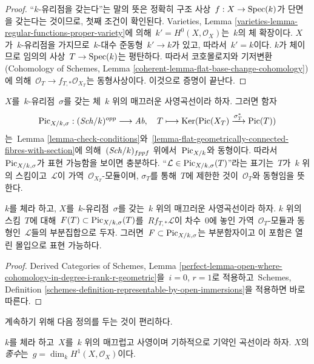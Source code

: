 \begin{proof}
“$k$-유리점을 갖는다”는 말의 뜻은 정확히 구조 사상\ 
$f : X \to \mathop{\mathrm{Spec}}(k)$가 단면을 갖는다는 것이므로, 첫째 조건이 확인된다.
Varieties, Lemma \ref{varieties-lemma-regular-functions-proper-variety}에 의해\ 
$k' = H^0(X, \mathcal{O}_X)$는\  $k$의 체 확장이다. $X$가\  $k$-유리점을
가지므로\  $k$-대수 준동형\  $k' \to k$가 있고, 따라서\  $k' = k$이다.
$k$가 체이므로 임의의 사상\  $T \to \mathop{\mathrm{Spec}}(k)$는 평탄하다. 따라서
코호몰로지와 기저변환
(Cohomology of Schemes, Lemma
\ref{coherent-lemma-flat-base-change-cohomology})에 의해\ 
$\mathcal{O}_T \to f_{T, *}\mathcal{O}_{X_T}$는 동형사상이다.
이것으로 증명이 끝난다.
\end{proof}

\noindent
$X$를\  $k$-유리점\  $\sigma$를 갖는 체\  $k$ 위의 매끄러운 사영곡선이라 하자.
그러면 함자
$$
\mathrm{Pic}_{X/k, \sigma} : (\mathit{Sch}/k)^{opp} \longrightarrow \textit{Ab},\quad
T \longmapsto \mathop{\mathrm{Ker}}(\mathop{\mathrm{Pic}}\nolimits(X_T) \xrightarrow{\sigma_T^*} \mathop{\mathrm{Pic}}\nolimits(T))
$$
는\  Lemma \ref{lemma-check-conditions}와\ 
\ref{lemma-flat-geometrically-connected-fibres-with-section}에 의해\ 
$(\mathit{Sch}/k)_{fppf}$ 위에서\  $\mathrm{Pic}_{X/k}$와 동형이다.
따라서\  $\mathrm{Pic}_{X/k, \sigma}$가 표현 가능함을 보이면 충분하다.
“$\mathcal{L} \in \mathrm{Pic}_{X/k, \sigma}(T)$”라는 표기는\  $T$가\ 
$k$ 위의 스킴이고\  $\mathcal{L}$이 가역\  $\mathcal{O}_{X_T}$-모듈이며,
$\sigma_T$를 통해\  $T$에 제한한 것이\  $\mathcal{O}_T$와 동형임을 뜻한다.

\begin{lemma}
\label{lemma-define-open}
$k$를 체라 하고, $X$를\  $k$-유리점\  $\sigma$를 갖는\  $k$ 위의 매끄러운
사영곡선이라 하자. $k$ 위의 스킴\  $T$에 대해\ 
$F(T) \subset \mathrm{Pic}_{X/k, \sigma}(T)$를\  $Rf_{T, *}\mathcal{L}$이 차수\  $0$에 놓인
가역\  $\mathcal{O}_T$-모듈과 동형인\  $\mathcal{L}$들의 부분집합으로 두자.
그러면\  $F \subset \mathrm{Pic}_{X/k, \sigma}$는 부분함자이고 이 포함은
열린 몰입으로 표현 가능하다.
\end{lemma}

\begin{proof}
Derived Categories of Schemes, Lemma
\ref{perfect-lemma-open-where-cohomology-in-degree-i-rank-r-geometric}을\ 
$i = 0$, $r = 1$로 적용하고\  Schemes, Definition
\ref{schemes-definition-representable-by-open-immersions}을 적용하면 바로
따른다.
\end{proof}

\noindent
계속하기 위해 다음 정의를 두는 것이 편리하다.

\begin{definition}
\label{definition-genus}
$k$를 체라 하고\  $X$를\  $k$ 위의 매끄럽고 사영이며 기하적으로 기약인
곡선이라 하자. $X$의 {\it 종수}는\ 
$g = \dim_k H^1(X, \mathcal{O}_X)$이다.
\end{definition}

